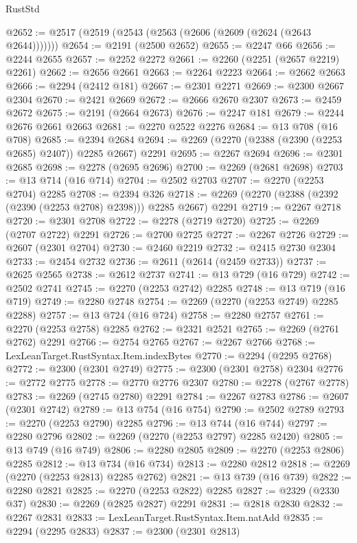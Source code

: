 \begin{lexlean}{RustStd}
\begin{coremodule}
@2652 := @2517 (@2519 (@2543 (@2563 (@2606 (@2609 (@2624 (@2643 @2644)))))))
@2654 := @2191 (@2500 @2652)
@2655 := @2247 @66
@2656 := @2244 @2655
@2657 := @2252 @2272
@2661 := @2260 (@2251 (@2657 @2219) @2261)
@2662 := @2656 @2661
@2663 := @2264 @2223
@2664 := @2662 @2663
@2666 := @2294 (@2412 @181)
@2667 := @2301 @2271
@2669 := @2300 @2667 @2304
@2670 := @2421 @2669
@2672 := @2666 @2670 @2307
@2673 := @2459 @2672
@2675 := @2191 (@2664 @2673)
@2676 := @2247 @181
@2679 := @2244 @2676 @2661 @2663
@2681 := @2270 @2522 @2276
@2684 := @13 @708 (@16 @708)
@2685 := @2394 @2684
@2694 := @2269 (@2270 (@2388 (@2390 (@2253 @2685) @2407)) @2285 @2667) @2291
@2695 := @2267 @2694
@2696 := @2301 @2685
@2698 := @2278 (@2695 @2696)
@2700 := @2269 (@2681 @2698)
@2703 := @13 @714 (@16 @714)
@2704 := @2502 @2703
@2707 := @2270 (@2253 @2704) @2285
@2708 := @2394 @326
@2718 := @2269 (@2270 (@2388 (@2392 (@2390 (@2253 @2708) @2398))) @2285 @2667) @2291
@2719 := @2267 @2718
@2720 := @2301 @2708
@2722 := @2278 (@2719 @2720)
@2725 := @2269 (@2707 @2722) @2291
@2726 := @2700 @2725
@2727 := @2267 @2726
@2729 := @2607 (@2301 @2704)
@2730 := @2460 @2219
@2732 := @2415 @2730 @2304
@2733 := @2454 @2732
@2736 := @2611 (@2614 (@2459 @2733))
@2737 := @2625 @2565
@2738 := @2612 @2737
@2741 := @13 @729 (@16 @729)
@2742 := @2502 @2741
@2745 := @2270 (@2253 @2742) @2285
@2748 := @13 @719 (@16 @719)
@2749 := @2280 @2748
@2754 := @2269 (@2270 (@2253 @2749) @2285 @2288)
@2757 := @13 @724 (@16 @724)
@2758 := @2280 @2757
@2761 := @2270 (@2253 @2758) @2285
@2762 := @2321 @2521
@2765 := @2269 (@2761 @2762) @2291
@2766 := @2754 @2765
@2767 := @2267 @2766
@2768 := LexLeanTarget.RustSyntax.Item.indexBytes
@2770 := @2294 (@2295 @2768)
@2772 := @2300 (@2301 @2749)
@2775 := @2300 (@2301 @2758) @2304
@2776 := @2772 @2775
@2778 := @2770 @2776 @2307
@2780 := @2278 (@2767 @2778)
@2783 := @2269 (@2745 @2780) @2291
@2784 := @2267 @2783
@2786 := @2607 (@2301 @2742)
@2789 := @13 @754 (@16 @754)
@2790 := @2502 @2789
@2793 := @2270 (@2253 @2790) @2285
@2796 := @13 @744 (@16 @744)
@2797 := @2280 @2796
@2802 := @2269 (@2270 (@2253 @2797) @2285 @2420)
@2805 := @13 @749 (@16 @749)
@2806 := @2280 @2805
@2809 := @2270 (@2253 @2806) @2285
@2812 := @13 @734 (@16 @734)
@2813 := @2280 @2812
@2818 := @2269 (@2270 (@2253 @2813) @2285 @2762)
@2821 := @13 @739 (@16 @739)
@2822 := @2280 @2821
@2825 := @2270 (@2253 @2822) @2285
@2827 := @2329 (@2330 @37)
@2830 := @2269 (@2825 @2827) @2291
@2831 := @2818 @2830
@2832 := @2267 @2831
@2833 := LexLeanTarget.RustSyntax.Item.natAdd
@2835 := @2294 (@2295 @2833)
@2837 := @2300 (@2301 @2813)

\end{coremodule}
\end{lexlean}
